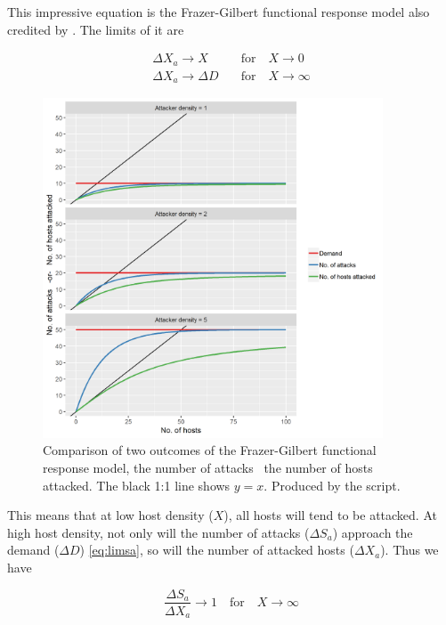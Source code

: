 This impressive equation is the Frazer-Gilbert functional response model \citep{FrazerGilbert} also credited by \citet{GutiConc81}. The limits of it are

\begin{equation}
  \begin{aligned}
    \Delta X_a \rightarrow X\quad        &\text{for}\quad X\rightarrow 0 \\
    \Delta X_a \rightarrow \Delta D\quad &\text{for}\quad X\rightarrow \infty
  \end{aligned}
\end{equation}

\begin{figure} [ht]
\centering
\includegraphics[width=0.9\textwidth]{graphics/func-resp-fg}
\caption{Comparison of two outcomes of the Frazer-Gilbert functional response model, the number of attacks \vs\ the number of hosts attacked. The black 1:1 line shows $y=x$. Produced by the  script.}
\label{fig:func-resp-fg}
\end{figure}

This means that at low host density ($X$), all hosts will tend to be attacked. At high host density, not only will the number of attacks ($\Delta S_a$) approach the demand ($\Delta D$) \eqref{eq:limsa}, so will the number of attacked hosts ($\Delta X_a$). Thus we have

\begin{equation}
  \frac{\Delta S_a}{\Delta X_a} \rightarrow 1\quad \text{for}\quad X\rightarrow \infty
\end{equation}

